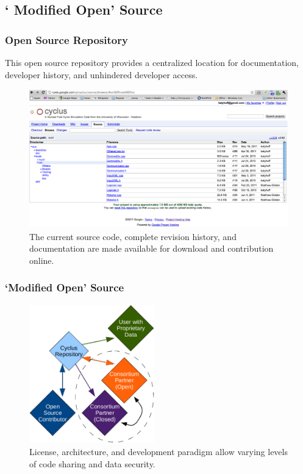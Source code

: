 \documentclass[9pt]{beamer}
\begin{document}
\subsection{ ` Modified Open' Source}
\begin{frame}[ctb!]
  \frametitle{Open Source Repository}
    This open source repository provides a centralized location for 
    documentation, developer history, and unhindered developer access.
  \begin{figure}[htbp!]
    \begin{center}
      \includegraphics[height=6cm]{source.eps}
    \end{center}
    \caption{The current source code, complete revision history, and 
    documentation are made available for download and contribution 
    online. }
    \label{fig:open}
  \end{figure}
\end{frame}
\begin{frame}[ctb!]
  \frametitle{ `Modified Open' Source}
  \begin{figure}[hbtp!]
    \begin{center}
      \includegraphics[height=6cm]{security.eps}
    \end{center}
    \caption{License, architecture, and development paradigm allow 
    varying levels of code sharing and data security.}
    \label{fig:security}
  \end{figure}
\end{frame}
\end{document}
